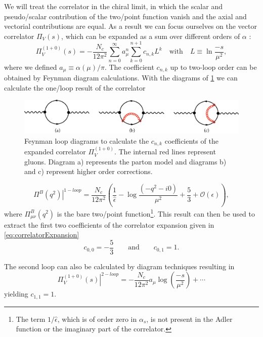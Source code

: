 \documentclass[../../index.tex]{subfiles}
\begin{document}
We will treat the correlator in the chiral limit, in which the scalar and
pseudo\-/scalar contribution of the two\-/point function vanish and the axial
and vectorial contributions are equal. As a result we can focus ourselves on the
vector correlator \(\Pi_V(s)\), which can be expanded as a sum over different
orders of \(\alpha\) \cite{Beneke2008}:
\begin{equation}
  \label{eq:correlatorExpansion}
  \Pi_V^{(1+0)}(s) = - \frac{N_c}{12 \pi^2} \sum_{n=0}^\infty a_\mu^n \sum_{k=0}^{n+1} c_{n,k} L^{k} \quad \text{with} \quad L \equiv \ln \frac{-s}{\mu^2},
\end{equation}
where we defined \(a_\mu \equiv \alpha(\mu)/ \pi\). The coefficient \(c_{n,k}\)
up to two-loop order can be obtained by Feynman diagram calculations. With the
diagrams of \cref{fig:perturbativeContributionFeynmanDiagrams} we can calculate
the one\-/loop result of the correlator \cite{Jamin2006}
\begin{figure}
  \centering
  \includegraphics[width=\textwidth]{./images/correlatorLoopDiagrams.eps}
  \caption{Feynman loop diagrams to calculate the \(c_{n,k}\) coefficients of
    the expanded correlator \(\Pi_V^{(1+0)}\). The internal red lines represent
    gluons. Diagram a) represents the parton model and diagrams b) and c)
    represent higher order corrections.}
  \label{fig:perturbativeContributionFeynmanDiagrams}
\end{figure}
\begin{equation}
  \left. \Pi^B(q^2) \right\rvert^{1-loop} = \frac{N_c}{12\pi^2} \left( \frac{1}{\hat \epsilon} - \log\frac{(-q^2 - i0)}{\mu^2} + \frac{5}{3} + \mathcal{O}(\epsilon) \right),
\end{equation}
where \(\Pi^B_{\mu\nu}(q^2)\) is the bare two\-/point function\footnote{The term
  \(1/ \hat \epsilon\), which is of order zero in \(\alpha_s\), is not present
  in the Adler function or the imaginary part of the correlator.}. This result
can then be used to extract the first two coefficients of the correlator
expansion given in \cref{eq:correlatorExpansion}
\begin{equation}
  c_{0,0} = - \frac{5}{3} \qquad \text{and} \qquad c_{0,1} = 1.
\end{equation}

The second loop can also be calculated by diagram techniques resulting in
\cite{Boito2011}
\begin{equation}
  \left. \Pi_V^{(1+0)}(s) \right\rvert^{2-loop} = -\frac{N_c}{12\pi^2} a_\mu \log(\frac{-s}{\mu^2}) + \cdots
\end{equation}
yielding \(c_{1,1} = 1\).
\end{document}
